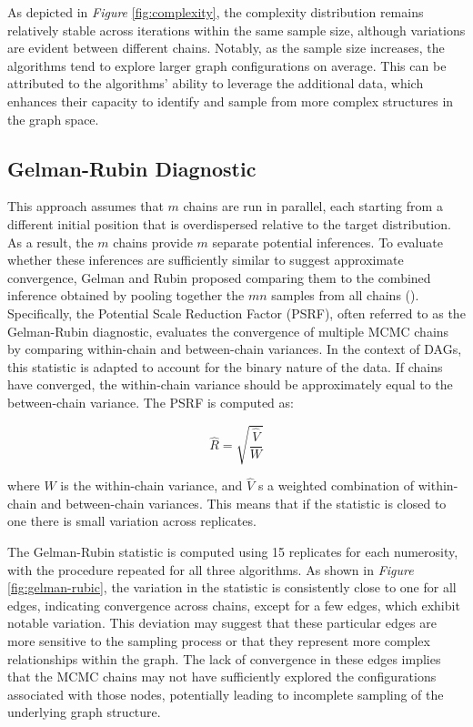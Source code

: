 \documentclass{report}
\begin{document}
As depicted in \textit{Figure} \ref{fig:complexity}, the complexity distribution remains relatively stable across iterations within the same sample size, although variations are evident between different chains. Notably, as the sample size increases, the algorithms tend to explore larger graph configurations on average. This can be attributed to the algorithms' ability to leverage the additional data, which enhances their capacity to identify and sample from more complex structures in the graph space.

\subsection{Gelman-Rubin Diagnostic}

This approach assumes that $m$ chains are run in parallel, each starting from a different initial position that is overdispersed relative to the target distribution. As a result, the $m$ chains provide $m$ separate potential inferences. To evaluate whether these inferences are sufficiently similar to suggest approximate convergence, Gelman and Rubin proposed comparing them to the combined inference obtained by pooling together the $mn$ samples from all chains (\citet{brooks1998general}).
Specifically, the Potential Scale Reduction Factor (PSRF), often referred to as the Gelman-Rubin diagnostic, evaluates the convergence of multiple MCMC chains by comparing within-chain and between-chain variances. In the context of DAGs, this statistic is adapted to account for the binary nature of the data. If chains have converged, the within-chain variance should be approximately equal to the between-chain variance. The PSRF is computed as:

$$
\hat{R} = \sqrt{\frac{\hat{V}}{W}}
$$

where $W$ is the within-chain variance, and $\hat{V}$ s a weighted combination of within-chain and between-chain variances. This means that if the statistic is closed to one there is small variation across replicates. 

The Gelman-Rubin statistic is computed using 15 replicates for each numerosity, with the procedure repeated for all three algorithms. As shown in \textit{Figure} \ref{fig:gelman-rubic}, the variation in the statistic is consistently close to one for all edges, indicating convergence across chains, except for a few edges, which exhibit notable variation. This deviation may suggest that these particular edges are more sensitive to the sampling process or that they represent more complex relationships within the graph. The lack of convergence in these edges implies that the MCMC chains may not have sufficiently explored the configurations associated with those nodes, potentially leading to incomplete sampling of the underlying graph structure. 
\end{document}
